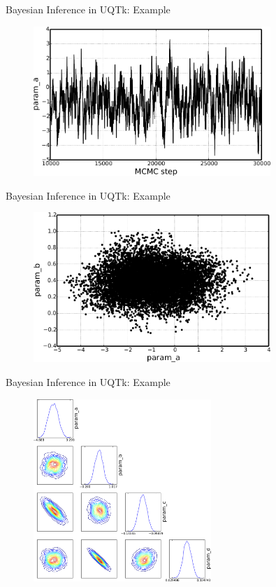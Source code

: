\documentclass[10pt]{beamer}
\begin{document}
\begin{frame}{Bayesian Inference in UQTk: Example}
     \begin{figure}
         \includegraphics[width=0.8\textwidth]{chainExample}
     \end{figure}
\end{frame}

\begin{frame}{Bayesian Inference in UQTk: Example}
     \begin{figure}
         \includegraphics[width=0.8\textwidth]{chain2DExample}
     \end{figure}
\end{frame}

\begin{frame}{Bayesian Inference in UQTk: Example}
     \begin{figure}
         \includegraphics[width=0.6\textwidth]{posteriorSummary}
     \end{figure}
\end{frame}
\end{document}
